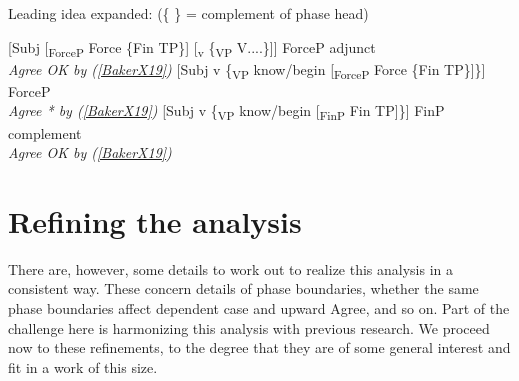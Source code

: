 \documentclass[output=paper]{langscibook}
\begin{document}
\begin{exe}
    \ex Leading idea expanded: (\{ \} = complement of phase head) \label{BakerX20}
        \begin{xlist}
        \ex \label{BakerX20a}
			 [Subj [\textsubscript{ForceP} Force \{Fin TP\}] [\textsubscript{v} \{\textsubscript{VP} V....\}]] ForceP adjunct
		           	\\
		        	\hspace*{9em} \textit{Agree OK by (\ref{BakerX19})}
		\ex \label{BakerX20b}
			[Subj v \{\textsubscript{VP} know/begin [\textsubscript{ForceP} Force \{Fin TP\}]\}] ForceP
		           	\\
		        	\hspace*{16.5em} \textit{Agree * by (\ref{BakerX19})}
		\ex \label{BakerX20c}
		    [Subj v \{\textsubscript{VP} know/begin [\textsubscript{FinP} Fin TP]\}] FinP complement
		           	\\
		        	\hspace*{13em} \textit{Agree OK by (\ref{BakerX19})}
        \end{xlist}
\end{exe}

\section{Refining the analysis}\label{sec:baker:5}

There are, however, some details to work out to realize this analysis in a consistent way. These concern details of phase boundaries, whether the same phase boundaries affect dependent case and upward Agree, and so on. Part of the challenge here is harmonizing this analysis with previous research. We proceed now to these refinements, to the degree that they are of some general interest and fit in a work of this size.
\end{document}

